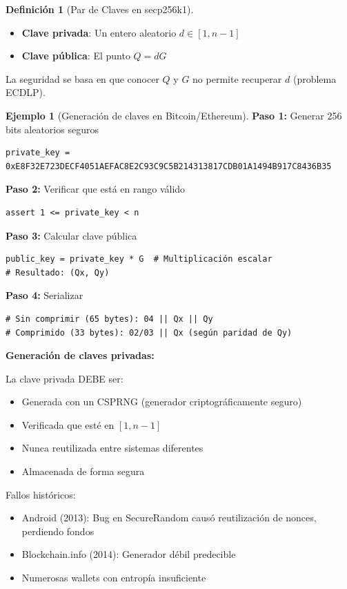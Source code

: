 \documentclass[11pt,a4paper,twoside,openright]{book}
\theoremstyle{definition}
\newtheorem{definition}{Definición}[chapter]
\newtheorem{example}{Ejemplo}[chapter]
\theoremstyle{plain}
\theoremstyle{remark}
\begin{document}
\begin{definition}[Par de Claves en secp256k1]
\begin{itemize}
    \item \textbf{Clave privada}: Un entero aleatorio $d \in [1, n-1]$
    \item \textbf{Clave pública}: El punto $Q = dG$
\end{itemize}

La seguridad se basa en que conocer $Q$ y $G$ no permite recuperar $d$ (problema ECDLP).
\end{definition}

\begin{example}[Generación de claves en Bitcoin/Ethereum]
\textbf{Paso 1:} Generar 256 bits aleatorios seguros
\begin{verbatim}
private_key = 0xE8F32E723DECF4051AEFAC8E2C93C9C5B214313817CDB01A1494B917C8436B35
\end{verbatim}

\textbf{Paso 2:} Verificar que está en rango válido
\begin{verbatim}
assert 1 <= private_key < n
\end{verbatim}

\textbf{Paso 3:} Calcular clave pública
\begin{verbatim}
public_key = private_key * G  # Multiplicación escalar
# Resultado: (Qx, Qy)
\end{verbatim}

\textbf{Paso 4:} Serializar
\begin{verbatim}
# Sin comprimir (65 bytes): 04 || Qx || Qy
# Comprimido (33 bytes): 02/03 || Qx (según paridad de Qy)
\end{verbatim}
\end{example}

\begin{advertencia}
\textbf{Generación de claves privadas:}

La clave privada DEBE ser:
\begin{itemize}
    \item Generada con un CSPRNG (generador criptográficamente seguro)
    \item Verificada que esté en $[1, n-1]$
    \item Nunca reutilizada entre sistemas diferentes
    \item Almacenada de forma segura
\end{itemize}

Fallos históricos:
\begin{itemize}
    \item Android (2013): Bug en SecureRandom causó reutilización de nonces, perdiendo fondos
    \item Blockchain.info (2014): Generador débil predecible
    \item Numerosas wallets con entropía insuficiente
\end{itemize}
\end{advertencia}
\end{document}
